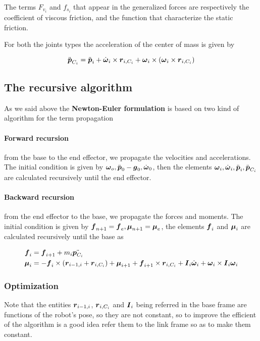 The terms $F_{v_i}$ and $f_{s_i}$ that appear in the generalized forces are respectively the coefficient of viscous friction, and the function that characterize the static friction.

For both the joints types the acceleration of the center of mass is given by

\[
	\ddot{\boldsymbol{p}}_{C_i} = \ddot{\boldsymbol{p}}_i + \dot{\boldsymbol{\omega}}_i \times \boldsymbol{r}_{i,C_i} + \boldsymbol{\omega}_i \times (\boldsymbol{\omega}_i \times \boldsymbol{r}_{i,C_i})
\]

\subsection{The recursive algorithm}

As we said above the \textbf{Newton-Euler formulation} is based on two kind of algorithm for the term propagation

\paragraph{Forward recursion}

from the base to the end effector, we propagate the velocities and accelerations.
The initial condition is given by $\boldsymbol{\omega}_o, \ddot{\boldsymbol{p}}_0-\boldsymbol{g}_0, \dot{\boldsymbol{\omega}}_0$, then the elements $\boldsymbol{\omega}_i, \dot{\boldsymbol{\omega}}_i, \ddot{\boldsymbol{p}}_i, \ddot{\boldsymbol{p}}_{C_i}$ are calculated recursively until the end effector.

\paragraph{Backward recursion}

from the end effector to the base, we propagate the forces and moments.
The initial condition is given by $\boldsymbol{f}_{n+1} = \boldsymbol{f}_e, \boldsymbol{\mu}_{n+1} = \boldsymbol{\mu}_e$, the elements $\boldsymbol{f}_i$ and $\boldsymbol{\mu}_i$ are calculated recursively until the base as

\begin{align*}
    \boldsymbol{f}_i &= \boldsymbol{f}_{i+1} + m_i \ddot{\boldsymbol{p}_{C_i}} \\
	\boldsymbol{\mu}_i &= -\boldsymbol{f}_i \times \left( \boldsymbol{r}_{i-1,i} + \boldsymbol{r}_{i,C_i} \right) + \boldsymbol{\mu}_{i+1} + \boldsymbol{f}_{i+1} \times \boldsymbol{r}_{i,C_i} + \boldsymbol{I}_i \dot{\boldsymbol{\omega}}_i + \boldsymbol{\omega}_i \times \boldsymbol{I}_i \boldsymbol{\omega}_i
\end{align*}

\subsubsection{Optimization}

Note that the entities $\boldsymbol{r}_{i-1,i}$, $\boldsymbol{r}_{i,C_i}$ and $\boldsymbol{I}_i$ being referred in the base frame are functions of the robot's pose, so they are not constant, so to improve the efficient of the algorithm is a good idea refer them to the link frame so as to make them constant.

